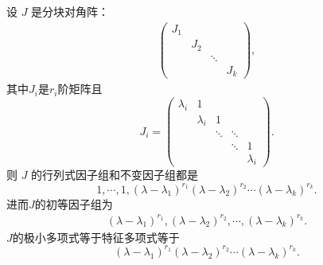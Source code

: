 \documentclass[../../main.tex]{subfiles}%
\begin{document}
\begin{lemma}\label{lemma:Jordan矩阵的初等因子组}
设 $J$ 是分块对角阵：
\begin{align*}
\begin{pmatrix}
J_1 & & & \\
& J_2 & & \\
& & \ddots & \\
& & & J_k
\end{pmatrix},
\end{align*}
其中$J_i$是$r_i$阶矩阵且
\[
J_i = \begin{pmatrix}
\lambda_i & 1 & & & \\
& \lambda_i & 1 & & \\
& & \ddots & \ddots & \\
& & & \ddots & 1 \\
& & & & \lambda_i
\end{pmatrix}.
\]
则 $J$ 的行列式因子组和不变因子组都是
\[
1,\cdots,1,(\lambda - \lambda_1)^{r_1}(\lambda - \lambda_2)^{r_2}\cdots(\lambda - \lambda_k)^{r_k}.
\]
进而$J$的初等因子组为
\begin{align*}
(\lambda - \lambda_1)^{r_1}, (\lambda - \lambda_2)^{r_2}, \cdots, (\lambda - \lambda_k)^{r_k}.
\end{align*}
$J$的极小多项式等于特征多项式等于
$$
(\lambda - \lambda_1)^{r_1}(\lambda - \lambda_2)^{r_2}\cdots(\lambda - \lambda_k)^{r_k}.
$$
\end{lemma}
\end{document}
